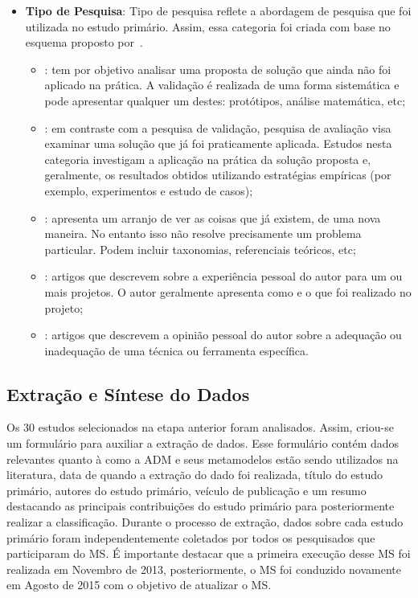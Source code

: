 \begin{itemize}
        \item \textbf{Tipo de Pesquisa}: Tipo de pesquisa reflete a abordagem de pesquisa que foi utilizada no estudo primário. Assim, essa categoria foi criada com base no esquema proposto por~.
        
        \begin{itemize}
            \item {}: tem por objetivo analisar uma proposta de solução que ainda não foi aplicado na prática. A validação é realizada de uma forma sistemática e pode apresentar qualquer um destes: protótipos, análise matemática, etc;
            \item {}: em contraste com a pesquisa de validação, pesquisa de avaliação visa examinar uma solução que já foi praticamente aplicada. Estudos nesta categoria investigam a aplicação na prática da solução proposta e, geralmente, os resultados obtidos utilizando estratégias empíricas (por exemplo, experimentos e estudo de casos);
            \item {}: apresenta um arranjo de ver as coisas que já existem, de uma nova maneira. No entanto isso não resolve precisamente um problema particular. Podem incluir taxonomias, referenciais teóricos, etc;
            \item {}: artigos que descrevem sobre a experiência pessoal do autor para um ou mais projetos. O autor geralmente apresenta como e o que foi realizado no projeto;
            \item {}: artigos que descrevem a opinião pessoal do autor sobre a adequação ou inadequação de uma técnica ou ferramenta específica.
        \end{itemize}
    
\end{itemize}


\subsection{Extração e Síntese do Dados}

Os 30 estudos selecionados na etapa anterior foram analisados. Assim, criou-se um formulário para auxiliar a extração de dados. Esse formulário contém dados relevantes quanto à como a ADM e seus metamodelos estão sendo utilizados na literatura, data de quando a extração do dado foi realizada, título do estudo primário, autores do estudo primário, veículo de publicação e um resumo destacando as principais contribuições do estudo primário para posteriormente realizar a classificação. Durante o processo de extração, dados sobre cada estudo primário foram independentemente coletados por todos os pesquisados que participaram do MS. É importante destacar que a primeira execução desse MS foi realizada em Novembro de 2013, posteriormente, o MS foi conduzido novamente em Agosto de 2015 com o objetivo de atualizar o MS.

